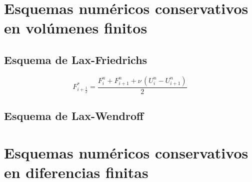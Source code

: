 \documentclass[a4paper,10pt]{report}
\newcommand{\EQ}[2]{\begin{equation}#1\label{#2}\end{equation}}
\newcommand{\PA}[1]{\left(#1\right)}
\begin{document}
\chapter{Esquemas numéricos conservativos en volúmenes finitos}

\section{Esquema de Lax-Friedrichs}

\EQ{F_{i+\frac12}^*=\frac{F_i^n+F_{i+1}^n+\nu\,\PA{U_i^n-U_{i+1}^n}}2}
{EqLaxFriedrichsVF}

\section{Esquema de Lax-Wendroff}

\chapter{Esquemas numéricos conservativos en diferencias finitas}
\end{document}
